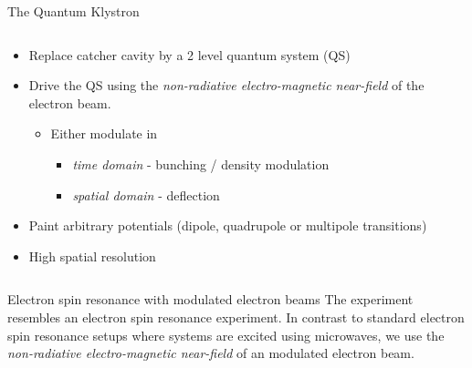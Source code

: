 \documentclass[final]{beamer}
\begin{document}
\begin{frame}[fragile]{}
\begin{columns}[T]
\begin{column}{.49\linewidth}
\begin{block}{\Large The Quantum Klystron}
\begin{columns}
\begin{column}{0.6\columnwidth}
            \begin{itemize}
              \item Replace catcher cavity by a 2 level quantum system (QS)
              \item Drive the QS using the \textit{non-radiative electro-magnetic near-field}
                    of the electron beam.
              \begin{itemize}
                \item Either modulate in
                \begin{itemize}
                    \item \textit{time domain} - bunching / density modulation
                    \item \textit{spatial domain} - deflection
                \end{itemize}
              \end{itemize}
              \item Paint arbitrary potentials (dipole, quadrupole or multipole transitions)
              \item High spatial resolution %
            \end{itemize}
          \end{column}
        \end{columns}
      \end{block}

      \begin{block}{\Large Electron spin resonance with modulated electron beams}
        The experiment resembles an electron spin resonance experiment. In contrast to
        standard electron spin resonance setups where systems are excited using microwaves,
        we use the \textit{non-radiative electro-magnetic near-field} of an modulated electron beam.


\end{block}
\end{column}
\end{columns}
\end{frame}
\end{document}
